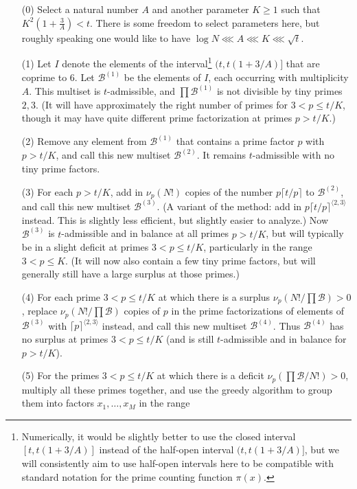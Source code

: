 \documentclass[12pt,a4paper,reqno]{amsart}
\numberwithin{equation}{section}
\theoremstyle{plain}
\theoremstyle{definition}
\newcommand\tuple{{\mathcal B}}
\begin{document}
\begin{enumerate}
\item[(0)] Select a natural number $A$ and another parameter $K \geq 1$ such that $K^2 (1+\frac{3}{A}) < t$.  There is some freedom to select parameters here, but roughly speaking one would like to have $\log N \lll A \lll K \lll \sqrt{t}$.
\item[(1)] Let $I$ denote the elements of the interval\footnote{Numerically, it would be slightly better to use the closed interval $[t,t(1+3/A)]$ instead of the half-open interval $(t,t(1+3/A)]$, but we will consistently aim to use half-open intervals here to be compatible with standard notation for the prime counting function $\pi(x)$.} $(t,t(1+3/A)]$ that are coprime to $6$.  Let $\tuple^{(1)}$ be the elements of $I$, each occurring with multiplicity $A$.  This multiset is $t$-admissible, and $\prod \tuple^{(1)}$ is not divisible by tiny primes $2,3$.  (It will have approximately the right number of primes for $3 < p \leq t/K$, though it may have quite different prime factorization at primes $p>t/K$.)
\item[(2)] Remove any element from $\tuple^{(1)}$ that contains a prime factor $p$ with $p > t/K$, and call this new multiset $\tuple^{(2)}$.  It remains $t$-admissible with no tiny prime factors.
\item[(3)] For each $p > t/K$, add in $\nu_p(N!)$ copies of the number $p \lceil t/p \rceil$ to $\tuple^{(2)}$, and call this new multiset $\tuple^{(3)}$.  (A variant of the method: add in $p \lceil t/p \rceil^{\langle 2,3\rangle}$ instead. This is slightly less efficient, but slightly easier to analyze.)  Now $\tuple^{(3)}$ is $t$-admissible and in balance at all primes $p>t/K$, but will typically be in a slight deficit at primes $3 < p \leq t/K$, particularly in the range $3 < p \leq K$.  (It will now also contain a few tiny prime factors, but will generally still have a large surplus at those primes.)
\item[(4)] For each prime $3 < p \leq t/K$ at which there is a surplus $\nu_p(N!/\prod \tuple) > 0$, replace $\nu_p(N!/\prod \tuple)$ copies of $p$ in the prime factorizations of elements of $\tuple^{(3)}$ with $\lceil p \rceil^{\langle 2,3 \rangle}$ instead, and call this new multiset $\tuple^{(4)}$.  Thus $\tuple^{(4)}$ has no surplus at primes $3 < p \leq t/K$ (and is still $t$-admissible and in balance for $p>t/K$).
\item [(5)]For the primes $3 < p \leq t/K$ at which there is a deficit $\nu_p(\prod \tuple/N!) > 0$, multiply all these primes together, and use the greedy algorithm to group them into factors $x_1, \dots, x_M$ in the range

\end{enumerate}
\end{document}

